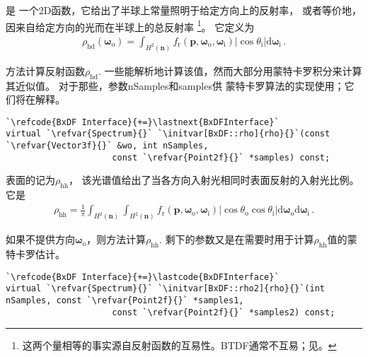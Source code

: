 是
一个2D函数，它给出了半球上常量照明于给定方向上的反射率，
或者等价地，因来自给定方向的光而在半球上的总反射率
\footnote{这两个量相等的事实源自反射函数的互易性。BTDF通常不互易；见。}。
它定义为
\begin{align}
    \label{eq:8.1}
    \rho_{\mathrm{hd}}({\bm\omega}_{\mathrm{o}})=\int_{H^2({\bm n})}{f_{\mathrm{r}}({\bm p},{\bm \omega}_\mathrm{o},{\bm \omega}_\mathrm{i})|\cos{\theta_{\mathrm{i}}}|\mathrm{d}{\bm \omega}_\mathrm{i}}\, .
\end{align}

方法计算反射函数$\rho_{\mathrm{hd}}$.
一些能解析地计算该值，然而大部分用蒙特卡罗积分来计算其近似值。
对于那些，参数{\ttfamily nSamples}和{\ttfamily samples}供
蒙特卡罗算法的实现使用；它们将在解释。
\begin{lstlisting}
`\refcode{BxDF Interface}{+=}\lastnext{BxDFInterface}`
virtual `\refvar{Spectrum}{}` `\initvar[BxDF::rho]{rho}{}`(const `\refvar{Vector3f}{}` &wo, int nSamples,
                     const `\refvar{Point2f}{}` *samples) const;
\end{lstlisting}

表面的记为$\rho_{\mathrm{hh}}$，
该光谱值给出了当各方向入射光相同时表面反射的入射光比例。它是
\begin{align*}
    \rho_{\mathrm{hh}}=\frac{1}{\pi}\int_{H^2({\bm n})}\int_{H^2({\bm n})}f_{\mathrm{r}}({\bm p},{\bm \omega}_\mathrm{o},{\bm \omega}_\mathrm{i})|\cos{\theta_{\mathrm{o}}}\cos{\theta_{\mathrm{i}}}|\mathrm{d}{\bm \omega}_\mathrm{o}\mathrm{d}{\bm \omega}_\mathrm{i}\, .
\end{align*}

如果不提供方向${\bm\omega}_\mathrm{o}$，则方法计算$\rho_{\mathrm{hh}}$.
剩下的参数又是在需要时用于计算$\rho_{\mathrm{hh}}$值的蒙特卡罗估计。
\begin{lstlisting}
`\refcode{BxDF Interface}{+=}\lastcode{BxDFInterface}`
virtual `\refvar{Spectrum}{}` `\initvar[BxDF::rho2]{rho}{}`(int nSamples, const `\refvar{Point2f}{}` *samples1,
                     const `\refvar{Point2f}{}` *samples2) const;
\end{lstlisting}

